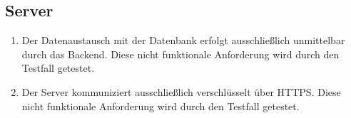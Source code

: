 \subsection*{Server}

\begin{samepage}
    \begin{enumerate}[label=\textbf{/NFS\arabic*0/}, align=left, start=7]
        \item \label{/NFS70/} Der \Gls{Datenaustausch} mit der \Gls{Datenbank} erfolgt ausschließlich unmittelbar durch das \Gls{Backend}. Diese nicht funktionale Anforderung wird durch den Testfall  getestet.
        \item \label{/NFS80/} Der \Gls{Server} kommuniziert ausschließlich verschlüsselt über \Gls{HTTPS}. Diese nicht funktionale Anforderung wird durch den Testfall  getestet.
    \end{enumerate}
\end{samepage}